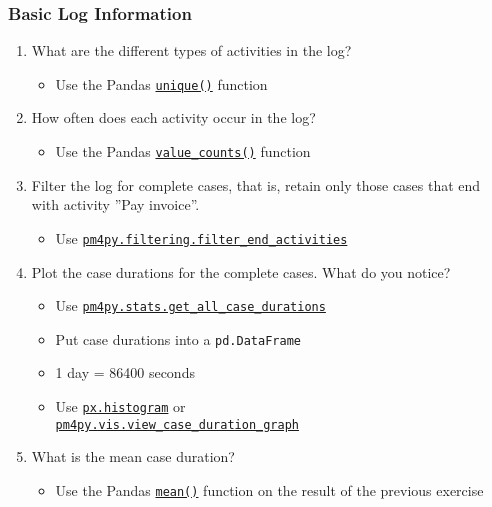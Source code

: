 \begin{exercisebox}

\subsubsection*{Basic Log Information}

\begin{enumerate}
    \item What are the different types of activities in the log?
    \begin{itemize}
       \item Use the Pandas \href{https://pandas.pydata.org/docs/reference/api/pandas.unique.html}{\texttt{unique()}} function
    \end{itemize}
    \item How often does each activity occur in the log?
    \begin{itemize}
       \item Use the Pandas \href{https://pandas.pydata.org/pandas-docs/stable/reference/api/pandas.Series.value_counts.html}{\texttt{value\_counts()}} function
    \end{itemize}
    \item Filter the log for complete cases, that is, retain only those cases that end with activity ''Pay invoice''.
    \begin{itemize}
       \item Use \href{https://processintelligence.solutions/static/api/2.7.11/generated/pm4py.filtering.filter_end_activities.html}{\texttt{pm4py.filtering.filter\_end\_activities}}
    \end{itemize}
    \item Plot the case durations for the complete cases. What do you notice?
    \begin{itemize}
       \item Use \href{https://processintelligence.solutions/static/api/2.7.11/generated/pm4py.stats.get_all_case_durations.html}{\texttt{pm4py.stats.get\_all\_case\_durations}}
       \item Put case durations into a \texttt{pd.DataFrame}
       \item 1 day = 86400 seconds
       \item Use \href{https://plotly.com/python/histograms/}{\texttt{px.histogram}} or \\ \href{https://processintelligence.solutions/static/api/2.7.11/generated/pm4py.vis.view_case_duration_graph.html}{\texttt{pm4py.vis.view\_case\_duration\_graph}}
    \end{itemize}
    \item What is the mean case duration?
    \begin{itemize}
       \item Use the Pandas \href{https://pandas.pydata.org/docs/reference/api/pandas.DataFrame.mean.html}{\texttt{mean()}} function on the result of the previous exercise
    \end{itemize}
\end{enumerate}
\end{exercisebox}

